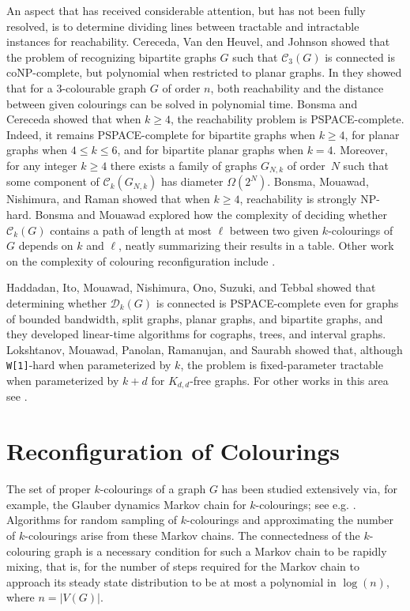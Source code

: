\documentclass[12pt]{article}%
\begin{document}
An aspect that has received considerable attention, but has not been fully
resolved, is to determine dividing lines between tractable and intractable
instances for reachability. Cereceda, Van den Heuvel, and Johnson
\cite{26CM-CHJ2} showed that the problem of recognizing bipartite graphs $G$
such that $\mathcal{C}_{3}(G)$ is connected is coNP-complete, but polynomial
when restricted to planar graphs. In \cite{26CM-CHJ3} they showed that for a
$3$-colourable graph $G$ of order $n$, both reachability and the distance
between given colourings can be solved in polynomial time. Bonsma and Cereceda
\cite{26CM-BC} showed that when $k\geq4$, the reachability problem is
PSPACE-complete. Indeed, it remains PSPACE-complete for bipartite graphs when
$k\geq4$, for planar graphs when $4\leq k\leq6$, and for bipartite planar
graphs when $k=4$. Moreover, for any integer $k\geq4$ there exists a family of
graphs $G_{N,k}$ of order~$N$ such that some component of $\mathcal{C}%
_{k}(G_{N,k})$ has diameter $\Omega(2^{N})$. Bonsma, Mouawad, Nishimura, and
Raman \cite{26CM-BMNR} showed that when $k\geq4$, reachability is strongly
NP-hard. Bonsma and Mouawad \cite{26CM-BM} explored how the complexity of
deciding whether $\mathcal{C}_{k}(G)$ contains a path of length at most $\ell$
between two given $k$-colourings of $G$ depends on $k$ and $\ell$, neatly
summarizing their results in a table. Other work on the complexity of
colouring reconfiguration include \cite{26CM-BB, 26CM-BJLPP, 26CM-BCHJ,
26CM-BMMN, 26CM-CHJ1, 26CM-DFFV, 26CM-FJP, 26CM-Ito2, 26CM-IKD, 26CM-Jerrum,
26CM-JKKPP, 26CM-JKKPP2, 26CM-Molloy}.

Haddadan, Ito, Mouawad, Nishimura, Ono, Suzuki, and Tebbal \cite{26CM-HIMNOST}
showed that determining whether $\mathcal{D}_{k}(G)$ is connected is
PSPACE-complete even for graphs of bounded bandwidth, split graphs, planar
graphs, and bipartite graphs, and they developed linear-time algorithms for
cographs, trees, and interval graphs. Lokshtanov, Mouawad, Panolan, Ramanujan,
and Saurabh \cite{26CM-LMPRS} showed that, although \texttt{W[1]}-hard when
parameterized by $k$, the problem is fixed-parameter tractable when
parameterized by $k+d$ for $K_{d,d}$-free graphs. For other works in this area
see \cite{26CM-MNRSS, 26CM-Tebbal}.

\section{Reconfiguration of Colourings}

\label{SecColour}The set of proper $k$-colourings of a graph $G$ has been
studied extensively via, for example, the Glauber dynamics Markov chain for
$k$-colourings; see e.g. \cite{26CM-DFFV, 26CM-DGM, 26CM-Jerrum, 26CM-LM,
26CM-Molloy}. Algorithms for random sampling of $k$-colourings and
approximating the number of $k$-colourings arise from these Markov chains. The
connectedness of the $k$-colouring graph is a necessary condition for such a
Markov chain to be rapidly mixing, that is, for the number of steps required
for the Markov chain to approach its steady state distribution to be at most a
polynomial in $\log(n)$, where $n=|V(G)|$.
\end{document}
